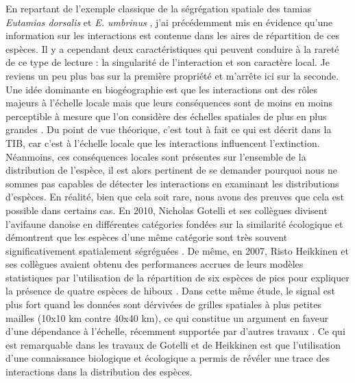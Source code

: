 En repartant de l'exemple classique de la ségrégation spatiale des
tamias \emph{Eutamias dorsalis} et \emph{E. umbrinus} \citep{Brown1971},
j'ai précédemment mis en évidence qu'une information sur les
interactions est contenue dans les aires de répartition de ces espèces.
Il y a cependant deux caractéristiques qui peuvent conduire à la rareté
de ce type de lecture : la singularité de l'interaction et son caractère
local. Je reviens un peu plus bas sur la première propriété et m'arrête
ici sur la seconde. Une idée dominante en biogéographie est que les
interactions ont des rôles majeurs à l'échelle locale mais que leurs
conséquences sont de moins en moins perceptible à mesure que l'on
considère des échelles spatiales de plus en plus grandes \citep[voir
l'unique figure de][]{McGill2010}. Du point de vue théorique, c'est tout
à fait ce qui est décrit dans la TIB, car c'est à l'échelle locale que
les interactions influencent l'extinction. Néanmoins, ces conséquences
locales sont présentes sur l'ensemble de la distribution de l'espèce, il
est alors pertinent de se demander pourquoi nous ne sommes pas capables
de détecter les interactions en examinant les distributions d'espèces.
En réalité, bien que cela soit rare, nous avons des preuves que cela est
possible dans certains cas. En 2010, Nicholas Gotelli et ses collègues
divisent l'avifaune danoise en différentes catégories fondées sur la
similarité écologique et démontrent que les espèces d'une même catégorie
sont très souvent significativement spatialement ségréguées
\citep{Gotelli2010}. De même, en 2007, Risto Heikkinen et ses collègues
avaient obtenu des performances accrues de leurs modèles statistiques
par l'utilisation de la répartition de six espèces de pics pour
expliquer la présence de quatre espèces de hiboux \citep{Heikkinen2007}.
Dans cette même étude, le signal est plus fort quand les données sont
dérvivées de grilles spatiales à plus petites mailles (10x10 km contre
40x40 km), ce qui constitue un argument en faveur d'une dépendance à
l'échelle, récemment supportée par d'autres travaux
\citep{Belmaker2015}. Ce qui est remarquable dans les travaux de Gotelli
et de Heikkinen est que l'utilisation d'une connaissance biologique et
écologique a permis de révéler une trace des interactions dans la
distribution des espèces.

